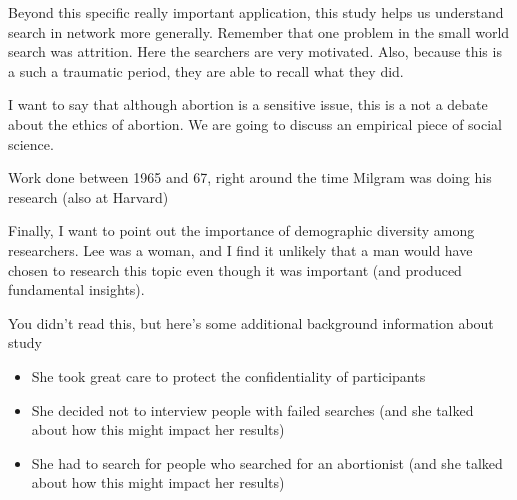 \documentclass[aspectratio=169]{beamer}
\begin{document}
\begin{frame}
{Beyond this specific really important application, this study helps us understand search in network more generally.  Remember that one problem in the small world search was attrition.  Here the searchers are very motivated. Also, because this is a such a traumatic period, they are able to recall what they did.  

I want to say that although abortion is a sensitive issue, this is a not a debate about the ethics of abortion.  We are going to discuss an empirical piece of social science.

Work done between 1965 and 67, right around the time Milgram was doing his research (also at Harvard)

Finally, I want to point out the importance of demographic diversity among researchers.  Lee was a woman, and I find it unlikely that a man would have chosen to research this topic even though it was important (and produced fundamental insights).

}

\end{frame}
\begin{frame}

You didn't read this, but here's some additional background information about study
\begin{itemize}
\item She took great care to protect the confidentiality of participants
\pause
\item She decided not to interview people with failed searches (and she talked about how this might impact her results)
\pause
\item She had to search for people who searched for an abortionist (and she talked about how this might impact her results)
\end{itemize}

\end{frame}
\end{document}
